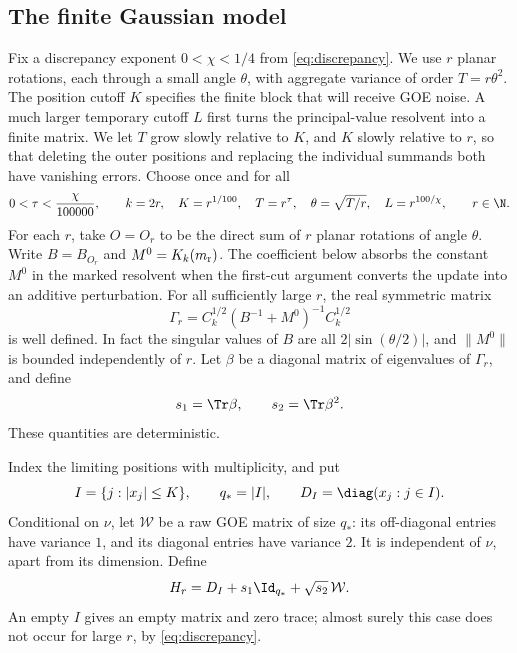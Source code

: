 \subsection{The finite Gaussian model}

Fix a discrepancy exponent \(0<\chi<1/4\) from
\eqref{eq:discrepancy}. We use \(r\) planar rotations, each through a
small angle \(\theta\), with aggregate variance of order
\(T=r\theta^2\). The position cutoff \(K\) specifies the finite block
that will receive GOE noise. A much larger temporary cutoff \(L\)
first turns the principal-value resolvent into a finite matrix.
We let \(T\) grow slowly relative to \(K\), and \(K\) slowly relative
to \(r\), so that deleting the outer positions and replacing the
individual summands both have vanishing errors. Choose once and for all
\begin{equation}\label{eq:sw-parameters}
 0<\tau<\frac{\chi}{100000},\qquad
 k=2r,\quad K=r^{1/100},\quad T=r^\tau,\quad
 \theta=\sqrt{T/r},\quad L=r^{100/\chi},
 \qquad r\in\N.
\end{equation}
For each \(r\), take \(O=O_r\) to be the direct sum of \(r\) planar rotations
of angle \(\theta\). Write \(B=B_{O_r}\) and \(M^0=K_k(m_{\rm r})\).
The coefficient below absorbs the constant \(M^0\) in the marked
resolvent when the first-cut argument converts the update into an
additive perturbation.
For all sufficiently large \(r\), the real symmetric matrix
\begin{equation}\label{eq:sw-coefficient}
 \Gamma_r=C_k^{1/2}(B^{-1}+M^0)^{-1}C_k^{1/2}
\end{equation}
is well defined. In fact the singular values of \(B\) are all
\(2|\sin(\theta/2)|\), and \(\|M^0\|\) is bounded independently of \(r\).
Let \(\beta\) be a diagonal matrix of eigenvalues of \(\Gamma_r\), and define
\begin{equation}\label{eq:sw-moments}
 s_1=\Tr\beta,\qquad s_2=\Tr\beta^2.
\end{equation}
These quantities are deterministic.

Index the limiting positions with multiplicity, and put
\[
 I=\{j:|x_j|\le K\},\qquad q_*=|I|,\qquad
 D_I=\diag(x_j:j\in I).
\]
Conditional on \(\nu\), let \(\mathcal W\) be a raw GOE matrix of size \(q_*\):
its off-diagonal entries have variance \(1\), and its diagonal entries have
variance \(2\). It is independent of \(\nu\), apart from its dimension. Define
\begin{equation}\label{eq:sw-inserted-matrix}
 H_r=D_I+s_1\Id_{q_*}+\sqrt{s_2}\,\mathcal W.
\end{equation}
An empty \(I\) gives an empty matrix and zero trace; almost surely this case
does not occur for large \(r\), by \eqref{eq:discrepancy}.

